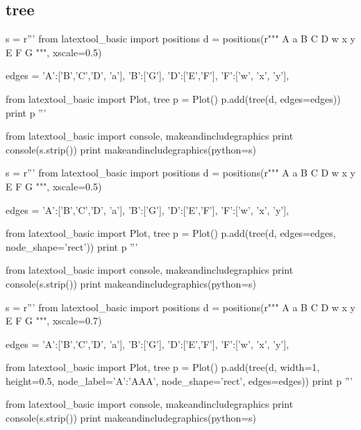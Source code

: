 \subsection{tree}

\begin{python}
s = r'''
from latextool_basic import positions
d = positions(r"""
  A   a 
B C D    w x y
    E F  
G
""", xscale=0.5)

edges = {'A':['B','C','D', 'a'],
         'B':['G'],
         'D':['E','F'],
         'F':['w', 'x', 'y'],
}

from latextool_basic import Plot, tree
p = Plot()
p.add(tree(d, edges=edges))
print p
'''

from latextool_basic import console, makeandincludegraphics
print console(s.strip())
print makeandincludegraphics(python=s)
\end{python}




\begin{python}
s = r'''
from latextool_basic import positions
d = positions(r"""
  A   a 
B C D    w x y
    E F  
G
""", xscale=0.5)

edges = {'A':['B','C','D', 'a'],
         'B':['G'],
         'D':['E','F'],
         'F':['w', 'x', 'y'],
}

from latextool_basic import Plot, tree
p = Plot()
p.add(tree(d, edges=edges, node_shape='rect'))
print p
'''

from latextool_basic import console, makeandincludegraphics
print console(s.strip())
print makeandincludegraphics(python=s)
\end{python}




\begin{python}
s = r'''
from latextool_basic import positions
d = positions(r"""
  A   a 
B C D    w x y
    E F  
G
""", xscale=0.7)

edges = {'A':['B','C','D', 'a'],
         'B':['G'],
         'D':['E','F'],
         'F':['w', 'x', 'y'],
}

from latextool_basic import Plot, tree
p = Plot()
p.add(tree(d,
           width=1, height=0.5, 
           node_label={'A':'AAA'},
           node_shape='rect',
           edges=edges))
print p
'''

from latextool_basic import console, makeandincludegraphics
print console(s.strip())
print makeandincludegraphics(python=s)
\end{python}







